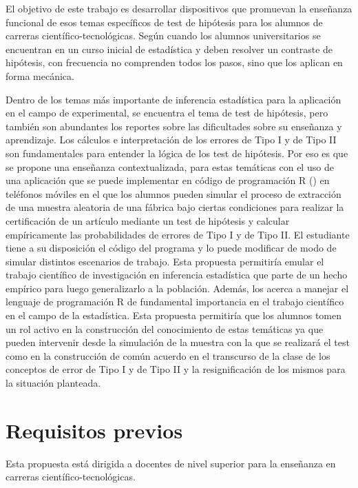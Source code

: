 \documentclass[oneside,spanish]{amsart}
\numberwithin{equation}{section}
\theoremstyle{definition}
\begin{document}
El objetivo de este trabajo es desarrollar dispositivos que promuevan la enseñanza funcional de esos temas específicos de test de hipótesis para los alumnos de carreras científico-tecnológicas.  Según \citet{batanero17} cuando los alumnos universitarios se encuentran en un curso inicial de estadística y deben resolver un contraste de hipótesis, con frecuencia no comprenden todos los pasos, sino que los aplican en forma mecánica.

Dentro de los temas más importante de inferencia estadística para la aplicación en el campo de experimental, se encuentra el tema de test de hipótesis, pero también son abundantes los reportes sobre las dificultades sobre su enseñanza y aprendizaje. Los cálculos e interpretación de los errores de Tipo I y de Tipo II son fundamentales para entender la lógica de los test de hipótesis. Por eso es que se propone una enseñanza contextualizada, para estas temáticas con el uso de una aplicación que se puede implementar en código de programación R (\citet{teamrc21}) en teléfonos móviles en el que los alumnos pueden simular el proceso de extracción de una muestra aleatoria de una fábrica bajo ciertas condiciones para realizar la certificación de un artículo mediante un test de hipótesis y calcular empíricamente las probabilidades de errores de Tipo I y de Tipo II. El estudiante tiene a su disposición el código del programa y lo puede modificar de modo de simular distintos escenarios de trabajo. Esta propuesta permitiría emular el trabajo científico de investigación en inferencia estadística que parte de un hecho empírico para luego generalizarlo a la población.  Además, los acerca a manejar el lenguaje de programación R de fundamental importancia en el trabajo científico en el campo de la estadística. Esta propuesta permitiría que los alumnos tomen un rol activo en la construcción del conocimiento de estas temáticas ya que pueden intervenir desde la simulación de la muestra con la que se realizará el test como en la construcción de común acuerdo en el transcurso de la clase de los conceptos de error de Tipo I y de Tipo II y la resignificación de los mismos para la situación planteada.

\section{Requisitos previos}

Esta propuesta está dirigida a docentes de nivel superior para la enseñanza en carreras científico-tecnológicas.
\end{document}
